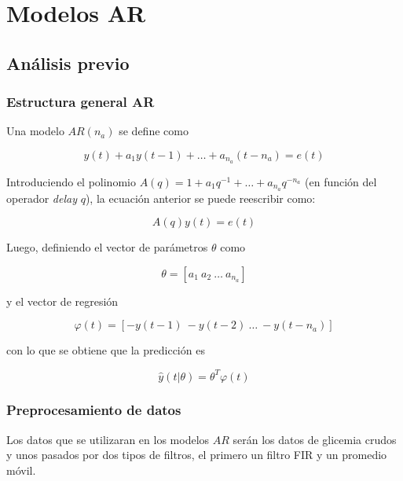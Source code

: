 
\section{Modelos AR}

\subsection{Análisis previo}

\subsubsection{Estructura general AR}

Una modelo $AR(n_a)$ se define como

\begin{equation}
	y(t) + a_1 y(t-1) + \dots + a_{n_a} (t - n_a) = e(t)
\end{equation}

Introduciendo el polinomio $A(q) = 1 + a_1 q^{-1} + \dots + a_{n_a} q^{-n_a}$ (en función del operador \emph{delay} $q$), la ecuación anterior se puede reescribir como:

\begin{equation}
	A(q) y(t) = e(t)
\end{equation}

Luego, definiendo el vector de parámetros $\theta$ como

\begin{equation}
	\theta = \left[a_1 \ a_2 \ \dots \ a_{n_a}\right]
\end{equation}

y el vector de regresión

\begin{equation}
	\varphi(t) = \left[-y(t-1) \ -y(t-2) \ \dots \ -y(t-n_a)\right]
\end{equation}

con lo que se obtiene que la predicción es

\begin{equation}
	\hat{y} (t|\theta) = \theta^T \varphi (t) 
\end{equation}


\subsubsection{Preprocesamiento de datos}

Los datos que se utilizaran en los modelos $AR$ serán los datos de glicemia crudos y unos pasados por dos tipos de filtros, el primero un filtro FIR y un promedio móvil.

